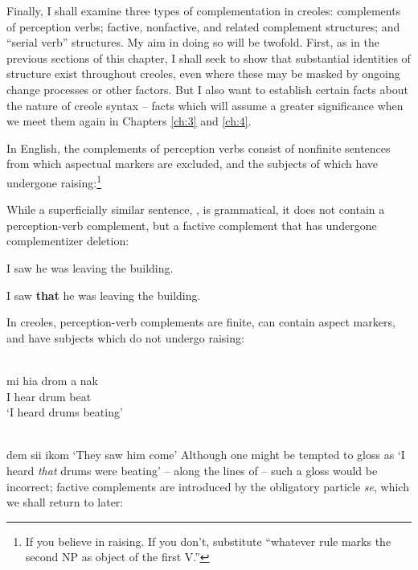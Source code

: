 Finally, I shall examine three types of complementation in creoles: complements of perception verbs; factive, nonfactive, and related complement structures; and ``serial verb'' structures. My aim in doing so will be twofold. First, as in the previous sections of this chapter, I shall seek to show that substantial identities of structure exist throughout creoles, even where these may be masked by ongoing change processes or other factors. But I also want to establish certain facts about the nature of creole syntax -- facts which will assume a greater significance when we meet them again in Chapters \ref{ch:3} and \ref{ch:4}.

In English, the complements of perception verbs consist of nonfinite sentences from which aspectual markers are excluded, and the subjects of which have undergone raising:\footnote{If you believe in raising. If you don't, substitute ``whatever rule marks the second NP as object of the first V.''}

\z

\z

\z

\z

\z
While a superficially similar sentence, , is grammatical, it does not contain a perception-verb complement, but a factive complement that has undergone complementizer deletion:

\ea\label{ex:2:130}I saw he was leaving the building.\z

\ea\label{ex:2:131}I saw \textbf{that} he was leaving the building.\z{}

In creoles, perception-verb complements are finite, can contain aspect markers, and have subjects which do not undergo raising:

\ea\label{ex:2:132}
\\
\gll mi hia drom a nak\\
I hear drum {\ASP} beat\\
\glt `I heard drums beating'
\z

\ea\label{ex:2:133}
\\
dem sii ikom
\glt `They saw him come'
\z
Although one might be tempted to gloss  as `I heard \textit{that} drums were beating' -- along the lines of  -- such a gloss would be incorrect; factive complements are introduced by the obligatory particle \textit{se}, which we shall return to later:


